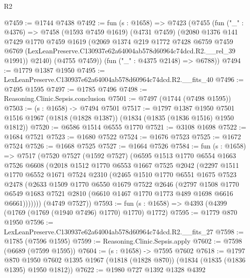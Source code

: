 \begin{lexlean}{R2}
\begin{coremodule}
@7459 := @1744 @7438
@7492 := fun (s : @1658) =>
  @7423
    (@7455
      (fun ("_" : @4376) =>
      @7458
        (@1593 @7459 @1619)
        (@4731 @7459)
        (@2080
          @1376
          @141
          @7429
          @1770
          @7459
          @1619
          (@2069
            @1374
            @219
            @1772
            @7428
            @6759
            @7459
            @6769
            (LexLeanPreserve.C130937e62a64004ab578d60964c74dcd.R2.__rel_39 @1991))
          @2140)
        (@4755 @7459))
      (fun ("_" : @4375 @2148) => @6788))
@7494 := @1779 @1387 @1950
@7495 := LexLeanPreserve.C130937e62a64004ab578d60964c74dcd.R2.__fits_40
@7496 := @7495 @1595
@7497 := @1785 @7496
@7498 := Reasoning.Clinic.Sepsis.conclusion
@7501 := @7497 (@1744 (@7498 @1595))
@7503 := (s : @1658) -> @7494 @7501
@7517 := @1797
    @1387
    @1950
    @7501
    @1516
    @1967
    (@1818 (@1828 @1387))
    (@1834 (@1835 (@1836 @1516) @1950 @1812))
@7520 := @6586 @1514 @6555 @1770
@7521 := @3108 @1698
@7522 := @1684 @7521
@7523 := @1680 @7522
@7524 := @1676 @7523
@7525 := @1672 @7524
@7526 := @1668 @7525
@7527 := @1664 @7526
@7584 := fun (s : @1658) =>
  @7517
    (@7520
      @7527
      (@1592 @7527)
      (@6595
        @1513
        @1770
        @6554
        @1663
        @7526
        @6608
        (@2018
          @1512
          @1770
          @6553
          @1667
          @7525
          @2042
          (@2297
            @1511
            @1770
            @6552
            @1671
            @7524
            @2310
            (@2465
              @1510
              @1770
              @6551
              @1675
              @7523
              @2478
              (@2633
                @1509
                @1770
                @6550
                @1679
                @7522
                @2646
                (@2797
                  @1508
                  @1770
                  @6549
                  @1683
                  @7521
                  @2810
                  (@6610 @1467 @1770 @1773 @489 @1698 @6616 @6661)))))))
      (@4749 @7527))
@7593 := fun (s : @1658) => @4393 (@4399 (@1769 (@1769 (@1940 @7496) @1770) @1770) @1772)
@7595 := @1779 @870 @1950
@7596 := LexLeanPreserve.C130937e62a64004ab578d60964c74dcd.R2.__fits_27
@7598 := @1785 (@7596 @1595)
@7599 := Reasoning.Clinic.Sepsis.apply
@7602 := @7598 (@6689 (@7599 @1595))
@7604 := (s : @1658) -> @7595 @7602
@7618 := @1797
    @870
    @1950
    @7602
    @1395
    @1967
    (@1818 (@1828 @870))
    (@1834 (@1835 (@1836 @1395) @1950 @1812))
@7622 := @1980 @727 @1392 @1328 @4392

\end{coremodule}
\end{lexlean}
